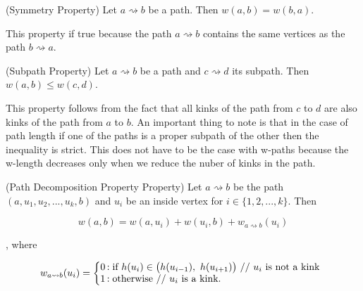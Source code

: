 



\begin{defn} (Symmetry Property) Let $a \rightsquigarrow b$ be a path. Then $w(a, b) = w(b, a)$. \end{defn}

This property if true because the path $a \rightsquigarrow b$ contains the same vertices as the path $b \rightsquigarrow a$.

\begin{defn} (Subpath Property) Let $a \rightsquigarrow b$ be a path and $c \rightsquigarrow d$ its subpath. Then $w(a, b) \le w(c, d)$. \end{defn}

This property follows from the fact that all kinks of the path from $c$ to $d$ are also kinks of the path from $a$ to $b$. An important thing to note is that in the case of path length if one of the paths is a proper subpath of the other then the inequality is strict. This does not have to be the case with w-paths because the w-length decreases only when we reduce the nuber of kinks in the path.

\begin{defn} (Path Decomposition Property Property) Let $a \rightsquigarrow b$ be the path $(a, u_1, u_2, ..., u_k, b)$ and $u_i$ be an inside vertex for $i \in \{1, 2, ..., k\}$. Then \end{defn}

    $$w(a, b) = w(a, u_i) + w(u_i, b) + w_{a \rightsquigarrow b}(u_i)$$

   , where

   $$
   w_{a \rightsquigarrow b}(u_i) = \left\{
       \begin{array}{@{}l@{\thinspace}l}
           \text{0}  &: \text{if } h(u_i) \in \big(h(u_{i-1}),~h(u_{i+1}) \big) \text{ // $u_i$ is not a kink} \\
           \text{1} &: \text{otherwise // $u_i$ is a kink.} \\
       \end{array}
   \right.
   $$

